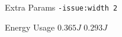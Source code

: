 
        \begin{tcolorbox}[width=\linewidth, colback=white!95!black, colframe=white!95!black]
            
            
            Extra Params \hfill \verb|-issue:width 2|

            Energy Usage \hfill \st{$0.365J$} $0.293J$

        \end{tcolorbox}
    